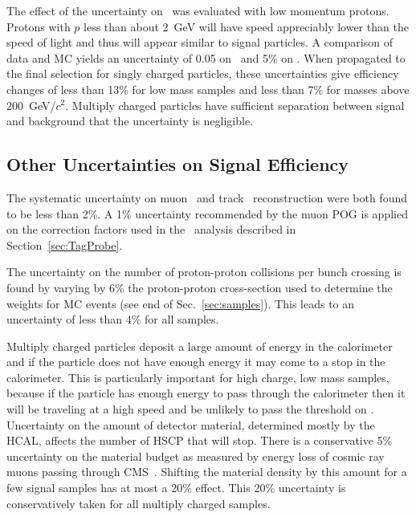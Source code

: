 The effect of the uncertainty on \dedx\ was evaluated with low momentum protons. Protons with $p$ less than  about 2~GeV will have speed appreciably lower than the
speed of light and thus will appear similar to signal particles. A comparison of data and MC yields an uncertainty of 0.05 on \ias\ and 5\% on \ih. %
When propagated to the final selection for singly charged particles, these uncertainties give efficiency changes of less than 13\% for low mass samples
and less than 7\% for masses above 200~GeV/$c^2$. Multiply charged particles have sufficient
separation between signal and background that the uncertainty is negligible.


\subsection{Other Uncertainties on Signal Efficiency}

The systematic uncertainty on muon~\cite{2012JInst...7P0002T} and track~\cite{CMS-PAS-TRK-10-002} reconstruction were both found to be less than 2\%.
A 1\% uncertainty recommended by the muon POG is applied on the correction factors used in the \muononly\ analysis described in Section~\ref{sec:TagProbe}.

The uncertainty on the number of proton-proton collisions per bunch crossing is found by varying by 6\% the 
proton-proton cross-section used to determine the weights for MC events (see end of Sec.~\ref{sec:samples}).
This leads to an uncertainty of less than 4\% for all samples.

Multiply charged particles deposit a large amount of energy in the calorimeter and if the particle does not have enough energy it may come to a stop in the calorimeter.
This is particularly important for high charge, low mass samples, because if the particle has enough energy to pass through the calorimeter then it will
be traveling at a high speed and be unlikely to pass the threshold on \invbeta. Uncertainty on the amount of detector material, determined mostly by the
HCAL, affects the number of HSCP that will stop. There is a conservative 5\% uncertainty on the material budget as measured by energy loss of cosmic ray muons
passing through CMS~\cite{2010JInst...5T3021C}. Shifting the material density by this amount for a few signal samples has at most a 20\% effect. This 20\% uncertainty is
conservatively taken for all multiply charged samples.

